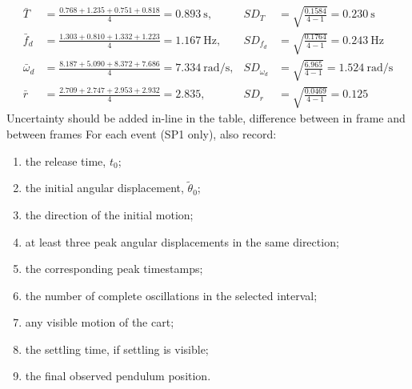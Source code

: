 \documentclass[11pt,a4paper]{article}
\begin{document}
\begin{align*}
\bar{T} &= \frac{0.768+1.235+0.751+0.818}{4} = 0.893~\text{s}, &
SD_{T} &= \sqrt{\frac{0.1584}{4-1}} = 0.230~\text{s} \\
\bar{f}_d &= \frac{1.303+0.810+1.332+1.223}{4} = 1.167~\text{Hz}, &
SD_{f_d} &= \sqrt{\frac{0.1764}{4-1}} = 0.243~\text{Hz} \\
\bar{\omega}_d &= \frac{8.187+5.090+8.372+7.686}{4} = 7.334~\text{rad/s}, &
SD_{\omega_d} &= \sqrt{\frac{6.965}{4-1}} = 1.524~\text{rad/s} \\
\bar{r} &= \frac{2.709+2.747+2.953+2.932}{4} = 2.835, &
SD_{r} &= \sqrt{\frac{0.0469}{4-1}} = 0.125
\end{align*}
{\Large Uncertainty should be added in-line in the table, difference between in frame and between frames}
For each event (SP1 only), also record:
\begin{enumerate}
    \item the release time, $t_0$;
    \item the initial angular displacement, $\tilde{\theta}_0$;
    \item the direction of the initial motion;
    \item at least three peak angular displacements in the same direction;
    \item the corresponding peak timestamps;
    \item the number of complete oscillations in the selected interval;
    \item any visible motion of the cart;
    \item the settling time, if settling is visible;
    \item the final observed pendulum position.
\end{enumerate}
\end{document}
